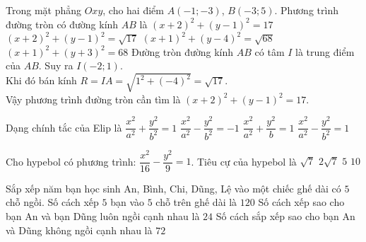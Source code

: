 \begin{ex}%
Trong mặt phẳng $Oxy$, cho hai điểm $A(-1;-3)$, $B(-3;5)$. Phương trình đường tròn có đường kính $AB$ là
\choice
{\True $(x+2)^2+(y-1)^2=17$}
{$(x+2)^2+(y-1)^2=\sqrt{17}$}
{$(x+1)^2+(y-4)^2=\sqrt{68}$}
{$(x+1)^2+(y+3)^2=68$}
\loigiai
{
Đường tròn đường kính $AB$ có tâm $I$ là trung điểm của $AB$. Suy ra $I(-2; 1)$.\\
Khi đó bán kính $R= IA= \sqrt{1^2+(-4)^2}= \sqrt{17}$.\\
Vậy phương trình đường tròn cần tìm là $(x+2)^2+(y-1)^2=17$.
}
\end{ex}

\begin{ex}%
Dạng chính tắc của Elip là
\choice
{\True$\dfrac{x^2}{a^2}+\dfrac{y^2}{b^2}=1$}
{$\dfrac{x^2}{a^2}-\dfrac{y^2}{b^2}=-1$}
{$\dfrac{x^2}{a^2}+\dfrac{y^2}{b}=1$}
{$\dfrac{x^2}{a^2}-\dfrac{y^2}{b^2}=1$}
\end{ex}

\begin{ex}%
Cho hypebol có phương trình: $\dfrac{x^2}{16}-\dfrac{y^2}{9}=1$. Tiêu cự của hypebol là
\choice
{$\sqrt{7}$}
{$2\sqrt{7}$}
{$5$}
{\True $10$}
\end{ex}
\TNTF
\begin{ex}%
Sắp xếp năm bạn học sinh An, Bình, Chi, Dũng, Lệ vào một chiếc ghế dài có $5$ chỗ ngồi.
{\True Số cách xếp $5$ bạn vào $5$ chỗ trên ghế dài là $120$}
{Số cách xếp sao cho bạn An và bạn Dũng luôn ngồi cạnh nhau là $24$}
{\True Số cách sắp xếp sao cho bạn An và Dũng không ngồi cạnh nhau là $72$}
\end{ex}

